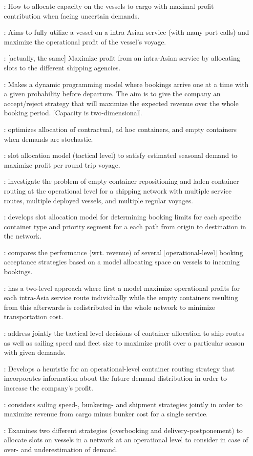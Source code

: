 \citet{Xianzhi07}: How to allocate capacity on the vessels to cargo with maximal profit contribution when facing uncertain demands.

\citet{Feng07}: Aims to fully utilize a vessel on a intra-Asian service (with many port calls) and maximize the operational profit of the vessel's voyage.

\citet{Feng08}: [actually, the same] Maximize profit from an intra-Asian service by allocating slots to the different shipping agencies.

\citet{Bingzhou08}: Makes a dynamic programming model where bookings arrive one at a time with a given probability before departure. The aim is to give the company an accept/reject strategy that will maximize the expected revenue over the whole booking period. [Capacity is two-dimensional].

\citet{Zou08}: optimizes allocation of contractual, ad hoc containers, and empty containers when demands are stochastic.

\citet{Lu10}: slot allocation model (tactical level) to satisfy estimated seasonal demand to maximize profit per round trip voyage.

\citet{Song12}: investigate the problem of empty container repositioning and laden container routing at the operational level for a shipping network with multiple service routes, multiple deployed vessels, and multiple regular voyages.

\citet{Zurheide12}: develops slot allocation model for determining booking limits for each specific container type and priority segment for a each path from origin to destination in the network.  

\citet{Zurheide15}: compares the performance (wrt. revenue) of several [operational-level] booking acceptance strategies based on a model allocating space on vessels to incoming bookings. 

\citet{Chang15}: has a two-level approach where first a model maximize operational profits for each intra-Asia service route individually while the empty containers resulting from this afterwards is redistributed in the whole network to minimize transportation cost.  

\citet{Wang15b}: address jointly the tactical level decisions of container allocation to ship routes as well as sailing speed and fleet size to maximize profit over a particular season with given demands.

\citet{Zhen17}: Develops a heuristic for an operational-level container routing strategy that incorporates information about the future demand distribution in order to increase the company's profit.

\citet{Wang19a}: considers sailing speed-, bunkering- and shipment strategies jointly in order to maximize revenue from cargo minus bunker cost for a single service.

\citet{Wang19b}: Examines two different strategies (overbooking and delivery-postponement) to allocate slots on vessels in a network at an operational level to consider in case of over- and underestimation of demand.
